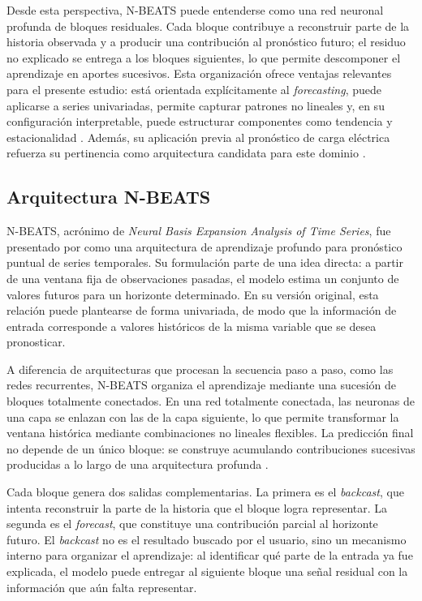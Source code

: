 Desde esta perspectiva, N-BEATS puede entenderse como una red neuronal profunda de bloques residuales. Cada bloque contribuye a reconstruir parte de la historia observada y a producir una contribución al pronóstico futuro; el residuo no explicado se entrega a los bloques siguientes, lo que permite descomponer el aprendizaje en aportes sucesivos. Esta organización ofrece ventajas relevantes para el presente estudio: está orientada explícitamente al \emph{forecasting}, puede aplicarse a series univariadas, permite capturar patrones no lineales y, en su configuración interpretable, puede estructurar componentes como tendencia y estacionalidad \parencite{oreshkin2020}. Además, su aplicación previa al pronóstico de carga eléctrica refuerza su pertinencia como arquitectura candidata para este dominio \parencite{oreshkin2021}.

\subsection{Arquitectura N-BEATS}

N-BEATS, acrónimo de \emph{Neural Basis Expansion Analysis of Time Series}, fue presentado por \textcite{oreshkin2020} como una arquitectura de aprendizaje profundo para pronóstico puntual de series temporales. Su formulación parte de una idea directa: a partir de una ventana fija de observaciones pasadas, el modelo estima un conjunto de valores futuros para un horizonte determinado. En su versión original, esta relación puede plantearse de forma univariada, de modo que la información de entrada corresponde a valores históricos de la misma variable que se desea pronosticar.

A diferencia de arquitecturas que procesan la secuencia paso a paso, como las redes recurrentes, N-BEATS organiza el aprendizaje mediante una sucesión de bloques totalmente conectados. En una red totalmente conectada, las neuronas de una capa se enlazan con las de la capa siguiente, lo que permite transformar la ventana histórica mediante combinaciones no lineales flexibles. La predicción final no depende de un único bloque: se construye acumulando contribuciones sucesivas producidas a lo largo de una arquitectura profunda \parencite{oreshkin2020}.

Cada bloque genera dos salidas complementarias. La primera es el \emph{backcast}, que intenta reconstruir la parte de la historia que el bloque logra representar. La segunda es el \emph{forecast}, que constituye una contribución parcial al horizonte futuro. El \emph{backcast} no es el resultado buscado por el usuario, sino un mecanismo interno para organizar el aprendizaje: al identificar qué parte de la entrada ya fue explicada, el modelo puede entregar al siguiente bloque una señal residual con la información que aún falta representar.

